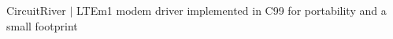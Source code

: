 Circuit\+River $\vert$ L\+T\+Em1 modem driver implemented in C99 for portability and a small footprint 